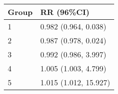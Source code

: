 \begin{tabular}{ll}
  \hline
Group & RR (96\%CI) \\ 
  \hline
   1 & 0.982 (0.964, 0.038) \\ 
     2 & 0.987 (0.978, 0.024) \\ 
     3 & 0.992 (0.986, 3.997) \\ 
     4 & 1.005 (1.003, 4.799) \\ 
     5 & 1.015 (1.012, 15.927) \\ 
   \hline
\end{tabular}

